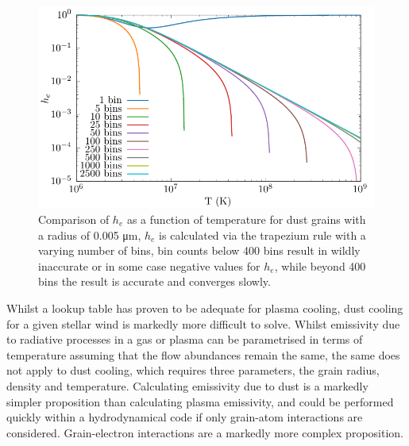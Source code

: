 \begin{figure}[h]
  \centering
  \includegraphics{assets/he_accuracy/he_acc.pdf}
  \caption[$h_e$ integration accuracy comparison]{Comparison of $h_e$ as a function of temperature for dust grains with a radius of 0.005 \si{\micro\metre}, $h_e$ is calculated via the trapezium rule with a varying number of bins, bin counts below 400 bins result in wildly inaccurate or in some case negative values for $h_e$, while beyond 400 bins the result is accurate and converges slowly.}
  \label{fig:he-accuracy-bins}
\end{figure}

Whilst a lookup table has proven to be adequate for plasma cooling, dust cooling for a given stellar wind is markedly more difficult to solve.
Whilst emissivity due to radiative processes in a gas or plasma can be parametrised in terms of temperature assuming that the flow abundances remain the same, the same does not apply to dust cooling, which requires three parameters, the grain radius, density and temperature.
Calculating emissivity due to dust is a markedly simpler proposition than calculating plasma emissivity, and could be performed quickly within a hydrodynamical code if only grain-atom interactions are considered.
Grain-electron interactions are a markedly more complex proposition.

